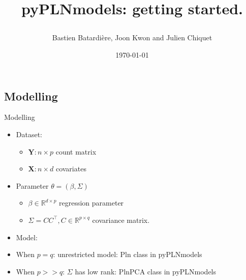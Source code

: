 \documentclass{beamer}
\author{Bastien Batardière, Joon Kwon and Julien Chiquet}
\date{\today}
\institute{Université Paris-Saclay, AgroParisTech, INRAE, UMR MIA Paris-Saclay}
\title{\parbox{\linewidth}{\centering pyPLNmodels: getting started.}}
\begin{document}
\begin{frame}
    \titlepage
\end{frame}

\subsection{Modelling}
\begin{frame}{Modelling}

\begin{itemize}
    \item Dataset:
    \begin{itemize}
        \item $\boldsymbol{Y}: n \times p$ count matrix
        \item $\boldsymbol{X}: n\times d $ covariates
    \end{itemize}
    \item Parameter $\theta = (\beta, \Sigma) $
    \begin{itemize}
        \item $\beta \in \mathbb R^{d\times p} $ regression parameter
        \item $\Sigma = CC^{\top}, C \in \mathbb R^{p\times q }$ covariance matrix.
    \end{itemize}
    \item Model:\vspace{-0.7cm}

{\par}
\item When $p=q$: unrestricted model: Pln class in pyPLNmodels
\item When $p>>q$: $\Sigma$ has low rank: PlnPCA class in pyPLNmodels
\end{itemize}
\end{frame}
\end{document}
